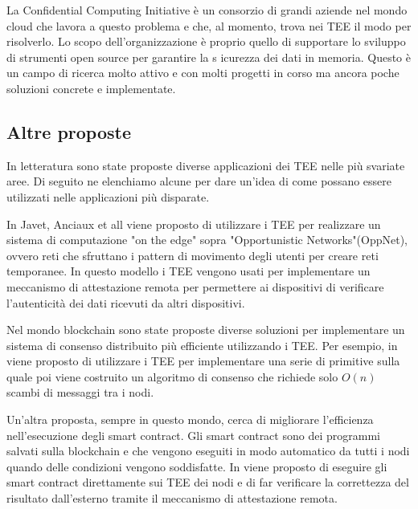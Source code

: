 \documentclass[12pt,italian]{report}
\begin{document}
La Confidential Computing Initiative\cite{confidential_computing_initiative}
è un consorzio di grandi aziende nel mondo cloud che lavora a questo problema
e che, al momento, trova nei TEE il modo per risolverlo.
Lo scopo dell'organizzazione è proprio quello di supportare lo sviluppo
di strumenti open source per garantire la s icurezza dei dati in memoria.
Questo è un campo di ricerca molto attivo e con molti progetti in corso ma
ancora poche soluzioni concrete e implementate.

\subsection{Altre proposte}
\label{subsec:altre-proposte}
In letteratura sono state proposte diverse applicazioni dei TEE nelle più
svariate aree. Di seguito ne elenchiamo alcune per dare un'idea di come
possano essere utilizzati nelle applicazioni più disparate.

\bigbreak \noindent

In Javet, Anciaux et all\cite{teeuses_edgeletcomputing} viene proposto di
utilizzare i TEE per realizzare un sistema di computazione "on the edge" sopra
"Opportunistic Networks"(OppNet), ovvero reti che sfruttano i
pattern di movimento degli utenti per creare reti temporanee.
In questo modello i TEE vengono usati per implementare un meccanismo di
attestazione remota per permettere ai dispositivi di verificare l'autenticità
dei dati ricevuti da altri dispositivi.

\bigbreak \noindent

Nel mondo blockchain sono state proposte diverse soluzioni per implementare
un sistema di consenso distribuito più efficiente utilizzando i TEE.
Per esempio, in \cite{teeuses_blockchainconsent} viene proposto di utilizzare i TEE per
implementare una serie di primitive sulla quale poi viene costruito un
algoritmo di consenso che richiede solo $O(n)$ scambi di messaggi tra i nodi.

Un'altra proposta, sempre in questo mondo, cerca di migliorare l'efficienza
nell'esecuzione degli smart contract.
Gli smart contract sono dei programmi salvati sulla blockchain e che vengono
eseguiti in modo automatico da tutti i nodi quando delle condizioni vengono
soddisfatte.
In \cite{teeuses_smartcontract} viene proposto di eseguire gli smart contract
direttamente sui TEE dei nodi e di far verificare la correttezza del risultato
dall'esterno tramite il meccanismo di attestazione remota.
\end{document}
